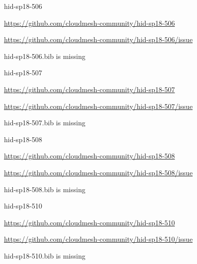 \begin{IU}

hid-sp18-506

\url{https://github.com/cloudmesh-community/hid-sp18-506}

\url{https://github.com/cloudmesh-community/hid-sp18-506/issue}

hid-sp18-506.bib is missing

\end{IU}


\begin{IU}

hid-sp18-507

\url{https://github.com/cloudmesh-community/hid-sp18-507}

\url{https://github.com/cloudmesh-community/hid-sp18-507/issue}

hid-sp18-507.bib is missing

\end{IU}


\begin{IU}

hid-sp18-508

\url{https://github.com/cloudmesh-community/hid-sp18-508}

\url{https://github.com/cloudmesh-community/hid-sp18-508/issue}

hid-sp18-508.bib is missing

\end{IU}


\begin{IU}

hid-sp18-510

\url{https://github.com/cloudmesh-community/hid-sp18-510}

\url{https://github.com/cloudmesh-community/hid-sp18-510/issue}

hid-sp18-510.bib is missing

\end{IU}


